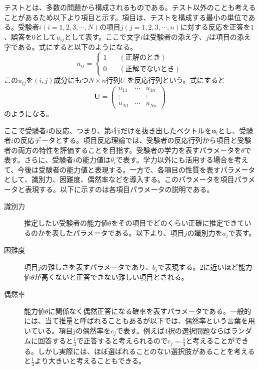 \documentclass[12pt]{jarticle}
\numberwithin{equation}{subsection}
\begin{document}
テストとは、多数の問題から構成されるものである。テスト以外のことも考えることがあるため以下より項目と示す。項目は、テストを構成する最小の単位である。受験者$i(i = 1, 2, 3, \cdots, N)$の項目$j(j = 1, 2, 3, \cdots, n)$に対する反応を正答を$1$、誤答を$0$として$u_{ij}$として表す。ここで文字$i$は受験者の添え字、$j$は項目の添え字である。式にすると以下のようになる。
\begin{displaymath}
  u_{ij} =
  \left\{
  \begin{array}{ll}
  1\quad & (正解のとき) \\
  0 & (正解でないとき)
  \end{array}
  \right.
\end{displaymath}
この$u_{ij}$を$(i,j)$成分にもつ$N\times n$行列$U$ を反応行列という。式にすると
\[ \boldsymbol{U} =
\left(
\begin{array}{ccc}
u_{11} & \cdots & u_{1n} \\
\vdots &  & \vdots \\
u_{N1} & \cdots & u_{Nn}
\end{array}
\right)
\]
のようになる。

ここで受験者$i$の反応、つまり、第$i$行だけを抜き出したベクトルを$\boldsymbol{u}_i$とし、受験者$i$の反応データとする。項目反応理論では、受験者の反応行列から項目と受験者の両方の特性を評価することを目指す。受験者の学力を表すパラメータを$\theta$で表す。さらに、受験者$i$の能力値は$\theta_i$で表す。学力以外にも活用する場合を考えて、今後は受験者の能力値と表現する。一方で、各項目の性質を表すパラメータとして、識別力、困難度、偶然率などを導入する。このパラメータを項目パラメータと表現する。以下に示すのは各項目パラメータの説明である。
\begin{description}
  \item[識別力]推定したい受験者の能力値$\theta$をその項目でどのくらい正確に推定できているのかを表したパラメータである。以下より、項目$j$の識別力を$a_j$で表す。
  \item[困難度] 項目$j$の難しさを表すパラメータであり、$b_j$で表現する。$2$に近いほど能力値$\theta$が高くないと正答できない難しい項目とされる。
  \item[偶然率] 能力値$\theta$に関係なく偶然正答になる確率を表すパラメータである。一般的には、当て推量と呼ばれることもあるが以下では、偶然率という言葉を用いている。項目$j$の偶然率を$c_j$で表す。例えば$4$択の選択問題ならばランダムに回答すると$\displaystyle\frac{1}{4}$で正答すると考えられるので$\displaystyle c_j = \frac{1}{4}$と考えることができる。しかし実際には、ほぼ選ばれることのない選択肢があることを考えると$\displaystyle \frac{1}{4}$より大きいと考えることもできる。
\end{description}
\end{document}
